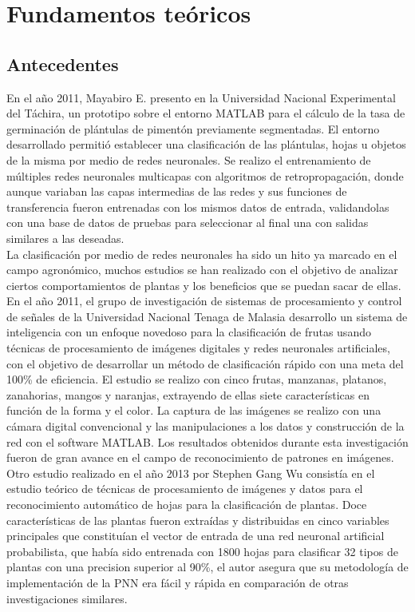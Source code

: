 \chapter{Fundamentos te\'oricos}

\section{Antecedentes}

En el año 2011, Mayabiro E. presento en la Universidad Nacional Experimental del Táchira, un prototipo sobre el entorno MATLAB para el cálculo de la tasa de germinación de plántulas de pimentón previamente segmentadas. El entorno desarrollado permitió establecer una clasificación de las plántulas, hojas u objetos de la misma por medio de redes neuronales. Se realizo el entrenamiento de múltiples redes neuronales multicapas con algoritmos de retropropagación, donde aunque variaban las capas intermedias de las redes y sus funciones de transferencia fueron entrenadas con los mismos  datos de entrada, validandolas con una base de datos de pruebas para seleccionar al final una con salidas similares a las deseadas.\\

La clasificación por medio de redes neuronales ha sido un hito ya marcado en el campo agronómico, muchos estudios se han realizado con el objetivo de analizar ciertos comportamientos de plantas y los beneficios que se puedan sacar de ellas. En el año 2011, el grupo de investigación de sistemas de procesamiento y control de señales de la Universidad Nacional Tenaga de Malasia desarrollo un sistema de inteligencia con un enfoque novedoso para la clasificación de frutas usando técnicas de procesamiento de imágenes digitales y redes neuronales artificiales, con el objetivo de desarrollar un método de clasificación rápido con una meta del 100\% de eficiencia. El estudio se realizo con cinco frutas, manzanas, platanos, zanahorias, mangos y naranjas, extrayendo de ellas siete características en función de la forma y el color. La captura de las imágenes se realizo con una cámara digital convencional y las manipulaciones a los datos y construcción de la red con el software MATLAB. Los resultados obtenidos durante esta investigación fueron de gran avance en el campo de reconocimiento de patrones en imágenes.\\


Otro estudio realizado en el año 2013 por Stephen Gang Wu consistía en el estudio teórico de técnicas de procesamiento de imágenes y datos para el reconocimiento automático de hojas para la clasificación de plantas. Doce características de las plantas fueron extraídas y distribuidas en cinco variables principales que constituían el vector de entrada de una red neuronal artificial probabilista, que había sido entrenada con 1800 hojas para clasificar 32 tipos de plantas con una precision superior al 90\%, el autor asegura que su metodología de implementación de la PNN era fácil y rápida en comparación de otras investigaciones similares.\\

